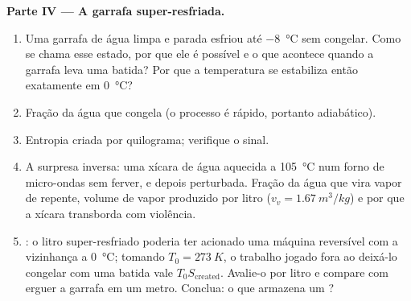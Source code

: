 \begin{problem}
\medskip
\noindent\textbf{Parte IV --- A garrafa super-resfriada.}
\begin{enumerate}[resume]
  \item Uma garrafa de água limpa e parada esfriou até \qty{-8}{\degreeCelsius}
        sem congelar. Como se chama esse estado, por que ele é possível
        e o que acontece quando a garrafa leva uma batida? Por que a
        temperatura se estabiliza então exatamente em \qty{0}{\degreeCelsius}?
  \item Fração da água que congela (o processo é rápido, portanto
        adiabático).
  \item Entropia criada por quilograma; verifique o sinal.
  \item A surpresa inversa: uma xícara de água aquecida a \qty{105}{\degreeCelsius}
        num forno de micro-ondas sem ferver, e depois perturbada. Fração
        da água que vira vapor de repente, volume de vapor produzido por
        litro ($v_v = \qty{1.67}{m^3/kg}$) e por que a xícara transborda com violência.
  \item {}: o litro super-resfriado poderia ter acionado uma
        máquina reversível com a vizinhança a \qty{0}{\degreeCelsius}; tomando
        $T_0 = \qty{273}{K}$, o trabalho jogado fora ao deixá-lo congelar com uma
        batida vale $T_0S_{\mathrm{created}}$. Avalie-o por litro e
        compare com erguer a garrafa em um metro. Conclua: o que armazena
        um ?
\end{enumerate}
\end{problem}
